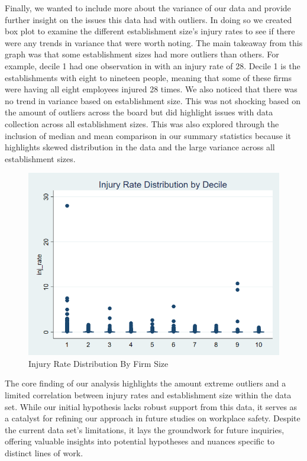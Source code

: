 \documentclass[12pt]{article}
\begin{document}
Finally, we wanted to include more about the variance of our data and provide further insight on the issues this data had with outliers. In doing so we created box plot to examine the different establishment size's injury rates to see if there were any trends in variance that were worth noting. The main takeaway from  this graph was that some establishment sizes had more outliers than others. For example, decile 1 had one observation in with an injury rate of 28. Decile 1 is the establishments with eight to nineteen people, meaning that some of these firms were having all eight employees injured 28 times. We also noticed that there was no trend in variance based on establishment size. This was not shocking based on the amount of outliers across the board but did highlight issues with data collection across all establishment sizes. This was also explored through the inclusion of median and mean comparison in our summary statistics because it highlights skewed distribution in the data and the large variance across all establishment sizes. 

\begin{figure}
    \centering
    \includegraphics[width=0.8\linewidth]{InjRateBox.png}
    \caption{Injury Rate Distribution By Firm Size}
    \label{fig:enter-label}
\end{figure}

The core finding of our analysis highlights the amount extreme outliers and a limited correlation between injury rates and establishment size within the data set. While our initial hypothesis lacks robust support from this data, it serves as a catalyst for refining our approach in future studies on workplace safety. Despite the current data set's limitations, it lays the groundwork for future inquiries, offering valuable insights into potential hypotheses and nuances specific to distinct lines of work.  
\end{document}
